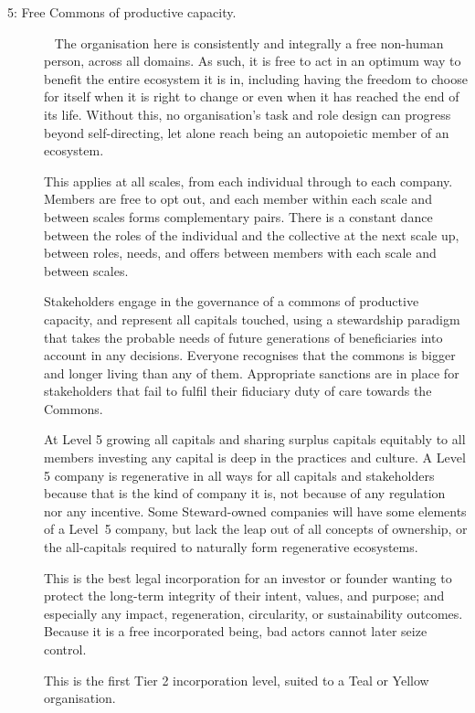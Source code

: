 \begin{description}
\item[5: Free Commons of productive capacity.] ~\newline
The organisation here is consistently and integrally a free non-human person, across all domains. As such, it is free to act in an optimum way to benefit the entire ecosystem it is in, including having the freedom to choose for itself when it is right to change or even when it has reached the end of its life. Without this, no organisation's task and role design can progress beyond self-directing, let alone reach being an autopoietic member of an ecosystem.


This applies at all scales, from each individual through to each company. Members are free to opt out, and each member within each scale and between scales forms complementary pairs. There is a constant dance between the roles of the individual and the collective at the next scale up, between roles, needs, and offers between members with each scale and between scales. 


Stakeholders engage in the governance of a commons of productive capacity, and represent all capitals touched, using a stewardship paradigm that takes the probable needs of future generations of beneficiaries into account in any decisions. Everyone recognises that the commons is bigger and longer living than any of them. Appropriate sanctions are in place for stakeholders that fail to fulfil their fiduciary duty of care towards the Commons. 


At Level 5 growing all capitals and sharing surplus capitals equitably to all members investing any capital is deep in the practices and culture. A Level 5 company is regenerative in all ways for all capitals and stakeholders because that is the kind of company it is, not because of any regulation nor any incentive. Some Steward-owned companies will have some elements of a Level~5 company\cite{purpose-foundation}, but lack the leap out of all concepts of ownership, or the all-capitals required to naturally form regenerative ecosystems.


This is the best legal incorporation for an investor or founder wanting to protect the long-term integrity of their intent, values, and purpose; and especially any impact, regeneration, circularity, or sustainability outcomes. Because it is a free incorporated being, bad actors cannot later seize control.


This is the first Tier 2 incorporation level, suited to a Teal or Yellow organisation.



\end{description}
